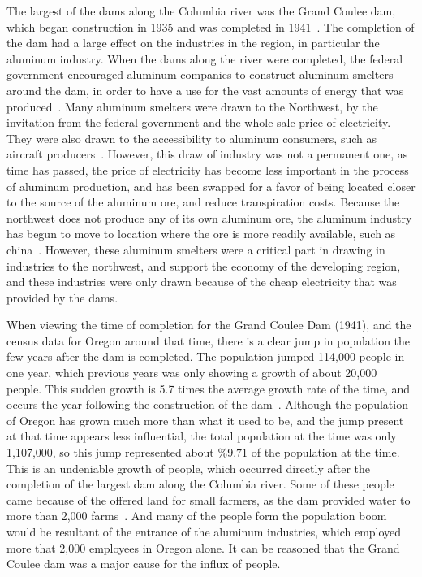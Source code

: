 \documentclass[12pt,twoside]{article}
\begin{document}
The largest of the dams along the Columbia river was the Grand Coulee dam,
which began construction in 1935 and was completed in 1941~\cite{GCD}. The
completion of the dam had a large effect on the industries in the region, in
particular the aluminum industry. When the dams along the river were completed,
the federal government encouraged aluminum companies to construct aluminum
smelters around the dam, in order to have a use for the vast amounts of energy
that was produced~\cite{OAI}. Many aluminum smelters were drawn to the
Northwest, by the invitation from the federal government and the whole sale
price of electricity. They were also drawn to the accessibility to aluminum
consumers, such as aircraft producers~\cite{OAH}. However, this draw of
industry was not a permanent one, as time has passed, the price of electricity
has become less important in the process of aluminum production, and has been
swapped for a favor of being located closer to the source of the aluminum ore,
and reduce transpiration costs. Because the northwest does not produce any of
its own aluminum ore, the aluminum industry has begun to move to location where
the ore is more readily available, such as china~\cite{OAH}. However, these
aluminum smelters were a critical part in drawing in industries to the
northwest, and support the economy of the developing region, and these
industries were only drawn because of the cheap electricity that was provided
by the dams.

When viewing the time of completion for the Grand Coulee Dam (1941), and the
census data for Oregon around that time, there is a clear jump in population
the few years after the dam is completed. The population jumped 114,000 people
in one year, which previous years was only showing a growth of about 20,000
people. This sudden growth is 5.7 times the average growth rate of the time,
and occurs the year following the construction of the dam~\cite{O_POP}.
Although the population of Oregon has grown much more than what it used to be,
and the jump present at that time appears less influential, the total
population at the time was only 1,107,000, so this jump represented about
$\%9.71$ of the population at the time. This is an undeniable growth of people,
which occurred directly after the completion of the largest dam along the
Columbia river. Some of these people came because of the offered land for small
farmers, as the dam provided water to more than 2,000 farms~\cite{GC}. And many
of the people form the population boom would be resultant of the entrance of
the aluminum industries, which employed more that 2,000 employees in Oregon
alone. It can be reasoned that the Grand Coulee dam was a major cause for the
influx of people.
\end{document}
